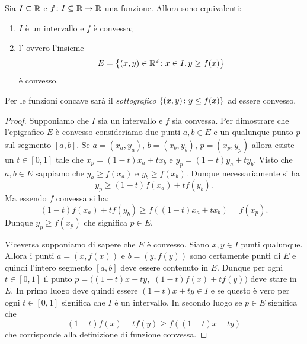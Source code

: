 \begin{theorem}
Sia $I\subseteq \mathbb R$ e $f\colon I\subseteq \mathbb R\to \mathbb R$ una funzione.
Allora sono equivalenti:
\begin{enumerate}
\item $I$ è un intervallo e $f$ è convessa;
\item l'
ovvero l'insieme
\[
  E = {\left\{ (x,y)\in \mathbb R^2\colon x\in I, y\ge f(x) \right\}}
\]
è convesso.
\end{enumerate}

Per le funzioni concave sarà il \emph{sottografico} ${\left\{ (x,y)\colon y\le f(x) \right\}}$ ad essere convesso.
\end{theorem}
%
\begin{proof}
Supponiamo che $I$ sia un intervallo e $f$ sia convessa. Per dimostrare che l'epigrafico $E$ è convesso consideriamo due punti $a,b\in E$ e un qualunque punto $p$ sul segmento $[a,b]$.
Se $a=(x_a, y_a)$, $b=(x_b,y_b)$, $p=(x_p, y_p)$
allora esiste un $t\in [0,1]$ tale che $x_p = (1-t)x_a + t x_b$ e $y_p=(1-t)y_a + t y_b$.
Visto che $a,b\in E$ sappiamo che $y_a \ge f(x_a)$ e $y_b\ge f(x_b)$. Dunque necessariamente si ha
\[
  y_p \ge (1-t)f(x_a) + t f(y_b).
\]
Ma essendo $f$ convessa si ha:
\[
  (1-t)f(x_a) + t f(y_b) \ge f((1-t)x_a + t x_b) = f(x_p).
\]
Dunque $y_p\ge f(x_p)$ che significa $p\in E$.

Viceversa supponiamo di sapere che $E$ è convesso. Siano $x,y\in I$ punti qualunque. Allora i punti $a=(x,f(x))$ e $b=(y,f(y))$ sono certamente punti di $E$ e quindi l'intero segmento $[a,b]$ deve essere contenuto in $E$. Dunque per ogni $t\in [0,1]$ il punto $p = ((1-t)x + t y,$ $(1-t)f(x)+ tf(y))$ deve stare in $E$. In primo luogo deve quindi essere $(1-t)x+ty\in I$ e se questo è vero per ogni $t\in[0,1]$ significa che $I$ è un intervallo. In secondo luogo se $p\in E$ significa che
\[
  (1-t)f(x) +t f(y) \ge f((1-t)x + t y)
\]
che corrisponde alla definizione di funzione convessa.
\end{proof}


